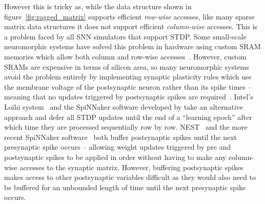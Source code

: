 \documentclass[utf8]{frontiersSCNS} %
\begin{document}
However this is tricky as, while the data structure shown in figure~\ref{fig:ragged_matrix} supports efficient \textit{row-wise} accesses, like many sparse matrix data structures it does not support efficient \textit{column-wise} accesses.
This is a problem faced by all SNN simulators that support STDP.
Some small-scale neuromorphic systems have solved this problem in hardware using custom SRAM memories which allow both column and row-wise accesses~\citep{Seo2011}.
However, custom SRAMs are expensive in terms of silicon area, so many neuromorphic systems avoid the problem entirely by implementing synaptic plasticity rules which use the membrane voltage of the postsynaptic neuron rather than its spike times -- meaning that no updates triggered by postsynaptic spikes are required~\citep{Frenkel2018,Qiao2015}.
Intel's Loihi system~\citep{Davies2018} and the SpiNNaker software developed by \citet{Galluppi2014a} take an alternative approach and defer all STDP updates until the end of a ``learning epoch'' after which time they are processed sequentially row by row.
NEST~\citep{Morrison2007} and the more recent SpiNNaker software~\citep{Knight2016} both buffer postsynaptic spikes until the next presynaptic spike occurs -- allowing weight updates triggered by pre and postsynaptic spikes to be applied in order without having to make any column-wise accesses to the synaptic matrix. 
However, buffering postsynaptic spikes makes access to other postsynaptic variables difficult as they would also need to be buffered for an unbounded length of time until the next presynaptic spike occurs.
\end{document}
